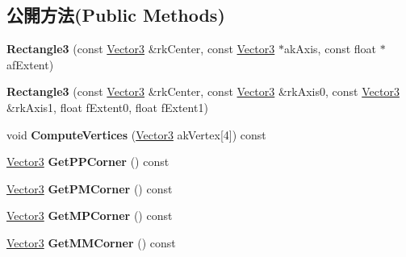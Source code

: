 \subsection*{公開方法(Public Methods)}
\begin{DoxyCompactItemize}
\item 
{\bfseries Rectangle3} (const \hyperlink{class_magnum_1_1_vector3}{Vector3} \&rk\+Center, const \hyperlink{class_magnum_1_1_vector3}{Vector3} $\ast$ak\+Axis, const float $\ast$af\+Extent)\hypertarget{class_magnum_1_1_rectangle3_a87c32b97b58ff89c5706bf1ea29d464e}{}\label{class_magnum_1_1_rectangle3_a87c32b97b58ff89c5706bf1ea29d464e}

\item 
{\bfseries Rectangle3} (const \hyperlink{class_magnum_1_1_vector3}{Vector3} \&rk\+Center, const \hyperlink{class_magnum_1_1_vector3}{Vector3} \&rk\+Axis0, const \hyperlink{class_magnum_1_1_vector3}{Vector3} \&rk\+Axis1, float f\+Extent0, float f\+Extent1)\hypertarget{class_magnum_1_1_rectangle3_a620ccba9c0e3d316bffb6842683467a0}{}\label{class_magnum_1_1_rectangle3_a620ccba9c0e3d316bffb6842683467a0}

\item 
void {\bfseries Compute\+Vertices} (\hyperlink{class_magnum_1_1_vector3}{Vector3} ak\+Vertex\mbox{[}4\mbox{]}) const \hypertarget{class_magnum_1_1_rectangle3_ab7c5b3b587477be0d035285e2dbc4256}{}\label{class_magnum_1_1_rectangle3_ab7c5b3b587477be0d035285e2dbc4256}

\item 
\hyperlink{class_magnum_1_1_vector3}{Vector3} {\bfseries Get\+P\+P\+Corner} () const \hypertarget{class_magnum_1_1_rectangle3_a4a2a4a979755195a36d1fb5943164bbe}{}\label{class_magnum_1_1_rectangle3_a4a2a4a979755195a36d1fb5943164bbe}

\item 
\hyperlink{class_magnum_1_1_vector3}{Vector3} {\bfseries Get\+P\+M\+Corner} () const \hypertarget{class_magnum_1_1_rectangle3_a9e7bc22198c93a7067743ef40d61a1bc}{}\label{class_magnum_1_1_rectangle3_a9e7bc22198c93a7067743ef40d61a1bc}

\item 
\hyperlink{class_magnum_1_1_vector3}{Vector3} {\bfseries Get\+M\+P\+Corner} () const \hypertarget{class_magnum_1_1_rectangle3_a6e4838e49a4c819b5533a6162a9fb1e1}{}\label{class_magnum_1_1_rectangle3_a6e4838e49a4c819b5533a6162a9fb1e1}

\item 
\hyperlink{class_magnum_1_1_vector3}{Vector3} {\bfseries Get\+M\+M\+Corner} () const \hypertarget{class_magnum_1_1_rectangle3_aa1040fbaae298823417ba16532783e3a}{}\label{class_magnum_1_1_rectangle3_aa1040fbaae298823417ba16532783e3a}

\end{DoxyCompactItemize}
